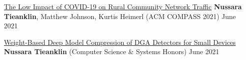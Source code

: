 \begin{cventries}
  \cvpub
    {\href{https://dl.acm.org/doi/10.1145/3460112.3472311}{The Low Impact of COVID-19 on Rural Community Network Traffic}} %
    {\textbf{Nussara Tieanklin}, Matthew Johnson, Kurtis Heimerl (ACM COMPASS 2021)}
    {} %
    {June 2021} %

    \cvpub
        {\href{https://www.tacoma.uw.edu/sites/default/files/2021-08/tieanklin_nussara_senior_thesis-2021.pdf}{Weight-Based Deep Model Compression of DGA Detectors for Small Devices}} %
        {\textbf{Nussara Tieanklin} (Computer Science \& Systems Honors)} 
        {} %
        {June 2021} %
\end{cventries}
